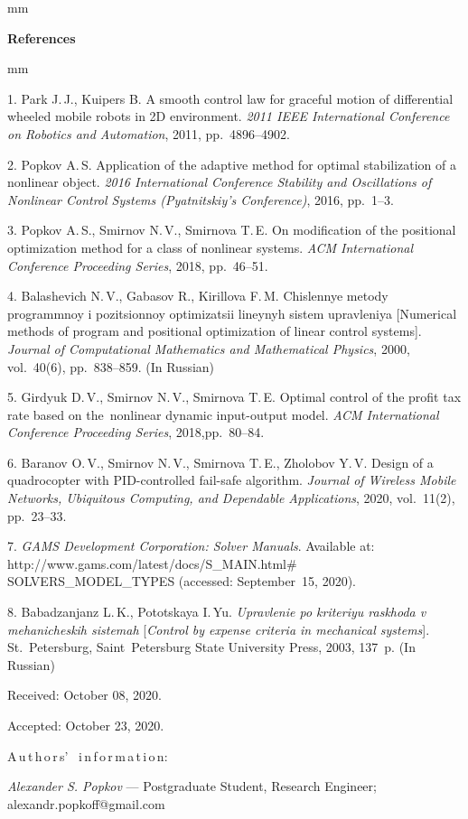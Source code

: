 

{\small



mm

\noindent \textbf{References} }

mm

{\footnotesize



1. {Park J.\,J., Kuipers B.} A smooth control law for graceful
motion of differential wheeled mobile robots in 2D environment.
{\it 2011 IEEE International Conference on Robotics and
Automation}, 2011, pp.~4896--4902.

2. {Popkov A.\,S.} Application of the adaptive method for optimal
stabilization of a nonlinear object. {\it 2016 International
Conference Stability and Oscillations of Nonlinear Control Systems
(Pyatnitskiy's Conference)}, 2016, pp.~1--3.

3. {Popkov A.\,S., Smirnov N.\,V., Smirnova T.\,E.} On
modification of the positional optimization method for a class of
nonlinear systems. {\it ACM International Conference Proceeding
Series}, 2018, pp.~46--51.%

4. {Balashevich N.\,V., Gabasov R., Kirillova F.\,M.} Chislennye
metody programmnoy i po\-zi\-tsion\-noy optimizatsii lineynyh
sistem upravleniya [Numerical methods of program and positional
optimization of linear control systems]. {\it Journal of
Computational Mathematics and Mathematical Physics}, 2000,
vol.~40(6), pp.~838--859. (In Russian)

5. {Girdyuk D.\,V., Smirnov N.\,V., Smirnova T.\,E.} Optimal
control of the profit tax rate based on the~nonlinear dynamic
input-output model. {\it ACM International Conference Proceeding
Series}, 2018,\linebreak pp.~80--84.

6. {Baranov O.\,V., Smirnov N.\,V., Smirnova T.\,E., Zholobov
Y.\,V.} Design of a quadrocopter with PID-controlled fail-safe
algorithm. {\it Journal of Wireless Mobile Networks, Ubiquitous
Computing, and Dependable Applications}, 2020, vol.~11(2),
pp.~23--33.

7. {\it GAMS Development Corporation: Solver Manuals}. Available
at:\\
http://www.gams.com/latest/docs/S\!\_\!MAIN.html$\#$SOLVERS\!\_\!MODEL\!\_\!TYPES
(accessed: September~15, 2020).

8. {Babadzanjanz L.\,K., Pototskaya I.\,Yu.} {\it Upravlenie po
kriteriyu raskhoda v mehanicheskih sistemah} [{\it Control by
expense criteria in mechanical systems}]. St.~Petersburg,
Saint~Petersburg State University Press, 2003, 137~p. (In Russian)


\vskip 1.5mm

%


Received:  October 08, 2020.

Accepted: October 23, 2020.

\vskip 4.5mm%
A\,u\,t\,h\,o\,r\,s' \ i\,n\,f\,o\,r\,m\,a\,t\,i\,o\,n:

\vskip 2mm \textit{Alexander S. Popkov} ---  Postgraduate Student,
Research Engineer; alexandr.popkoff@gmail.com


}
